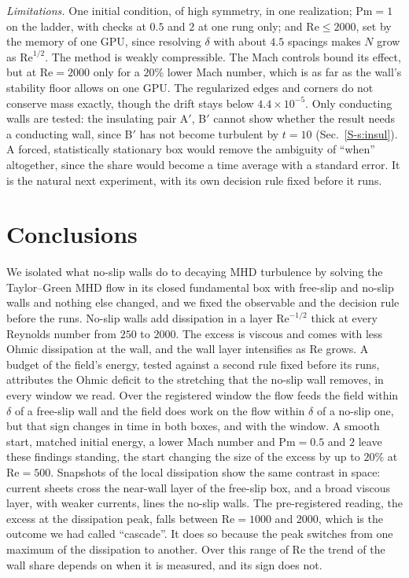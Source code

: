 \documentclass[aip,pop,reprint,amsmath,amssymb,superscriptaddress,floatfix]{revtex4-2}
\newcommand{\Rey}{\mathrm{Re}}
\begin{document}
\emph{Limitations.} One initial condition, of high symmetry, in one realization;
$\mathrm{Pm}=1$ on the ladder, with checks at $0.5$ and $2$ at one rung only; and
$\Rey\le2000$, set by the memory of one GPU, since resolving $\delta$ with about $4.5$
spacings makes $N$ grow as $\Rey^{1/2}$. The method is weakly compressible. The Mach
controls bound its effect, but at $\Rey=2000$ only for a $20$\% lower Mach number,
which is as far as the wall's stability floor allows on one GPU. The
regularized edges and corners do not conserve mass exactly, though the drift stays
below $4.4\times10^{-5}$. Only conducting walls are tested: the insulating pair A$'$,
B$'$ cannot show whether the result needs a conducting wall, since B$'$ has not
become turbulent by $t=10$ (Sec.~\ref{S-s:insul}). A forced, statistically
stationary box would remove the
ambiguity of ``when'' altogether, since the share would become a time average with a
standard error. It is the natural next experiment, with its own decision rule fixed
before it runs.

\section{Conclusions}

We isolated what no-slip walls do to decaying MHD turbulence by solving the
Taylor--Green MHD flow in its closed fundamental box with free-slip and no-slip walls
and nothing else changed, and we fixed the observable and the decision rule before the
runs. No-slip walls add dissipation in a layer $\Rey^{-1/2}$ thick at every Reynolds
number from $250$ to $2000$. The excess is viscous and comes with less Ohmic
dissipation at the wall, and the wall layer intensifies as $\Rey$ grows. A budget of
the field's energy, tested against a second rule fixed before its runs, attributes the
Ohmic deficit to the stretching that the no-slip wall removes, in every window we
read. Over the registered window the flow feeds the field within $\delta$ of a
free-slip wall and the field does work on the flow within $\delta$ of a no-slip one,
but that sign changes in time in both boxes, and with the window. A smooth start, matched initial energy, a lower Mach
number and $\mathrm{Pm}=0.5$ and $2$ leave these findings standing, the start changing
the size of the excess by up to $20$\% at $\Rey=500$. Snapshots
of the local dissipation show the same contrast in space: current sheets cross the
near-wall layer of the free-slip box, and a broad viscous layer, with weaker currents,
lines the no-slip walls. The pre-registered reading, the excess at the dissipation peak, falls between $\Rey=1000$
and $2000$, which is the outcome we had called ``cascade''. It does so because the
peak switches from one maximum of the dissipation to another. Over this range of
$\Rey$ the trend of the wall share depends on when it is measured, and its sign does
not.
\end{document}
